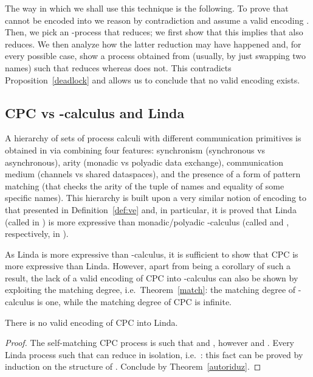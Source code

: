 \documentclass{LMCS}
\begin{document}
The way in which we shall use this technique is the following. To prove that 
 cannot be encoded into  we reason by contradiction and assume a
valid encoding . Then, we pick an -process  that reduces;
we first show that this implies that  also reduces. We then analyze how
the latter reduction may have happened and, for every possible case, show a process
 obtained from  (usually, by just swapping two names) such that 
reduces whereas  does not. This contradicts Proposition~\ref{deadlock}
and allows us to conclude that no valid encoding exists.


\subsection{CPC vs -calculus and Linda}
\label{subsec:pi-linda}

A hierarchy of sets of process calculi with different communication primitives is
obtained in \cite{G:IC08} via combining four features: 
synchronism (synchronous vs asynchronous), 
arity (monadic vs polyadic data exchange), 
communication medium (channels vs shared dataspaces), 
and the presence of a form of pattern matching (that checks the arity of the 
tuple of names and equality of some specific names).
This hierarchy is built upon a very similar notion of encoding to that presented
in Definition~\ref{def:ve} and, in particular, it is proved that Linda \cite{Gel85} (called  in \cite{G:IC08}) is more expressive than
monadic/polyadic -calculus \cite{milner.parrow.ea:calculus-mobile,milner:polyadic-tutorial} (called  and , respectively, in \cite{G:IC08}).

As Linda is more expressive than -calculus, it is sufficient to show that CPC is more expressive than Linda.
However, apart from being a corollary of such a result, the lack of a valid encoding of CPC into -calculus can also be shown by exploiting the matching degree, i.e.\ Theorem~\ref{match}: the matching degree of -calculus is one, while the matching degree of CPC is infinite.

\begin{thm}
\label{noCPCinLinda-1}
There is no valid encoding of CPC into Linda.
\end{thm}
\begin{proof}
The self-matching CPC process  is such that  and , however  and . Every Linda process  such that  can reduce in isolation, i.e.\ : this fact can be proved by induction on the structure of . Conclude by Theorem~\ref{autoriduz}.
\end{proof}
\end{document}
